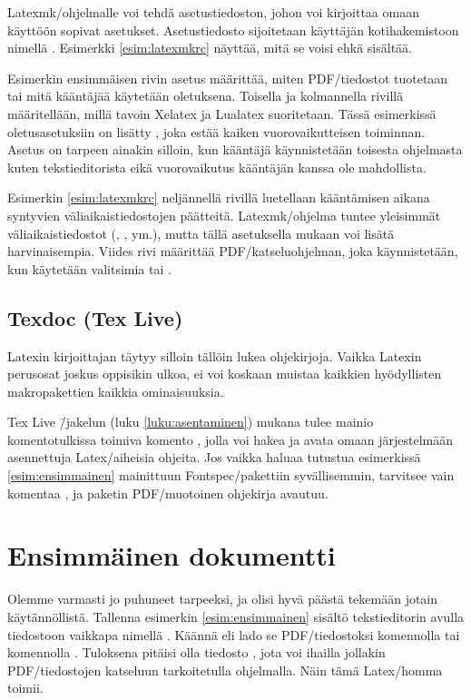 Latexmk\-/ohjelmalle voi tehdä asetustiedoston, johon voi kirjoittaa
omaan käyttöön sopivat asetukset. Asetustiedosto sijoitetaan käyttäjän
kotihakemistoon nimellä . Esimerkki
\ref{esim:latexmkrc} näyttää, mitä se voisi ehkä sisältää.

Esimerkin ensimmäisen rivin asetus määrittää, miten PDF\-/tiedostot
tuotetaan tai mitä kääntäjää käytetään oletuksena. Toisella ja
kolmannella rivillä määritellään, millä tavoin Xelatex ja Lualatex
suoritetaan. Tässä esimerkissä oletus\-asetuksiin on lisätty
, joka estää kaiken vuorovaikutteisen toiminnan.
Asetus on tarpeen ainakin silloin, kun kääntäjä käynnistetään toisesta
ohjelmasta kuten tekstieditorista eikä vuorovaikutus kääntäjän kanssa
ole mahdollista.



Esimerkin \ref{esim:latexmkrc} neljännellä rivillä luetellaan
kääntämisen aikana syntyvien väliaikaistiedostojen päätteitä.
Latexmk\-/ohjelma tuntee yleisimmät väliaikaistiedostot (,
,  ym.), mutta tällä asetuksella mukaan voi lisätä
harvinaisempia. Viides rivi määrittää PDF\-/katseluohjelman, joka
käynnistetään, kun käytetään valitsimia  tai
.

\subsection{Texdoc (Tex Live)}

Latexin kirjoittajan täytyy silloin tällöin lukea ohjekirjoja. Vaikka
Latexin perus\-osat joskus oppisikin ulkoa, ei voi koskaan muistaa
kaikkien hyödyllisten makropakettien kaikkia ominaisuuksia.

Tex Live \=/jakelun (luku \ref{luku:asentaminen}) mukana tulee mainio
komentotulkissa toimiva komento , jolla voi hakea ja avata
omaan järjestelmään asennettuja Latex\-/aiheisia ohjeita. Jos vaikka
haluaa tutustua esimerkissä \ref{esim:ensimmainen} mainittuun
Fontspec\-/pakettiin syvällisemmin, tarvitsee vain komentaa
, ja paketin PDF\-/muotoinen ohjekirja avautuu.

\section{Ensimmäinen dokumentti}

Olemme varmasti jo puhuneet tarpeeksi, ja olisi hyvä päästä tekemään
jotain käytännöllistä. Tallenna esimerkin \ref{esim:ensimmainen} sisältö
tekstieditorin avulla tiedostoon vaikkapa nimellä .
Käännä eli lado se PDF\-/tiedostoksi komennolla  tai komennolla . Tuloksena
pitäisi olla tiedosto , jota voi ihailla jollakin
PDF\-/tiedostojen katseluun tarkoitetulla ohjelmalla. Näin tämä
Latex\-/homma toimii.

